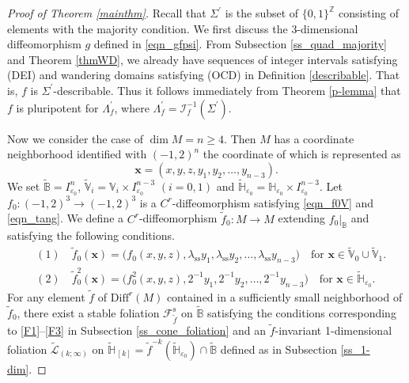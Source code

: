\documentclass{amsart}
\theoremstyle{definition}
\numberwithin{equation}{section}
\numberwithin{figure}{section}
\begin{document}
\begin{proof}[Proof of Theorem \ref{mainthm}]
Recall that $\Sigma^{\prime}$ is the subset of $\{0,1\}^{\mathbb{Z}}$ consisting of elements 
with the majority condition. 
We first discuss the 3-dimensional diffeomorphism $g$ defined in \eqref{eqn_gfpsi}.
From Subsection \ref{ss_quad_majority} and Theorem \ref{thmWD}, 
we already have sequences of integer intervals 
satisfying (DEI) and wandering domains  
satisfying (OCD) in Definition \ref{describable}. That is, 
$f$ is  $\Sigma^{\prime}$-describable. 
Thus it follows immediately from Theorem \ref{p-lemma} that  
$f$ is pluripotent for $\Lambda_{f}^{\prime}$, where $\Lambda_{f}^{\prime}=\mathcal{I}^{-1}_{f}(\Sigma^{\prime})$.


Now we consider the case of $\dim M=n\geq 4$.
Then $M$ has a coordinate neighborhood identified with $(-1,2)^n$ the coordinate of which 
is represented as
$$\boldsymbol{x}=(x,y,z,y_1,y_2,\dots,y_{n-3}).$$
We set $\widetilde{\mathbb{B}}=I_{\varepsilon_0}^n$, $\widetilde{\mathbb{V}}_i=\mathbb{V}_i\times 
I_{\varepsilon_0}^{n-3}$ $(i=0,1)$ and $\widetilde{\mathbb{H}}_{\varepsilon_0}=\mathbb{H}_{\varepsilon_0}\times 
I_{\varepsilon_0}^{n-3}$.
Let $f_0:(-1,2)^3\longrightarrow (-1,2)^3$ is a $C^r$-diffeomorphism satisfying 
\eqref{eqn_f0V} and \eqref{eqn_tang}.
We define a $C^r$-diffeomorphism $\widetilde f_0:M\longrightarrow M$ extending $f_0|_{\mathbb{B}}$ and 
satisfying the following conditions.
\begin{align*}
&(1)\quad \widetilde f_0(\boldsymbol{x})=\bigl(f_0(x,y,z),\lambda_{\mathrm{ss}}y_1,\lambda_{\mathrm{ss}}y_2,\dots,
\lambda_{\mathrm{ss}}y_{n-3}\bigr)\quad \text{for $\boldsymbol{x}\in \widetilde{\mathbb{V}}_0\cup \widetilde{\mathbb{V}}_1$}.\\
&(2)\quad \widetilde f_0^2(\boldsymbol{x})=\bigl(f_0^2(x,y,z),2^{-1}y_1,2^{-1}y_2,\dots,2^{-1}y_{n-3}\bigr)\quad \text{for $\boldsymbol{x}\in \widetilde{\mathbb{H}}_{\varepsilon_0}$}.
\end{align*}
For any element $\widetilde{f}$ of $\mathrm{Diff}^r(M)$ contained in a sufficiently small 
neighborhood of $\widetilde{f}_0$, there exist a stable foliation $\mathcal{F}_{\widetilde f}^{\mathrm{s}}$ on 
$\widetilde{\mathbb{B}}$ satisfying the conditions corresponding to \eqref{F1}--\eqref{F3} in 
Subsection \ref{ss_cone_foliation} and an $\widetilde f$-invariant 1-dimensional foliation  $\widetilde{\mathcal{L}}_{(k;\infty)}$ on $\widetilde{\mathbb{H}}_{\,[k]}
=\widetilde f^{-k}(\widetilde{\mathbb{H}}_{\varepsilon_0})\cap \widetilde{\mathbb B}$
defined as in Subsection \ref{ss_1-dim}.

\end{proof}
\end{document}
